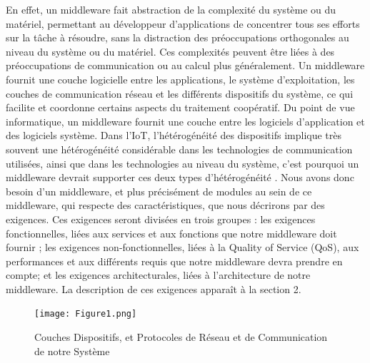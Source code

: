 En effet, un middleware fait abstraction de la complexité du système ou du matériel, permettant au développeur d'applications de concentrer tous ses efforts sur la tâche à résoudre, sans la distraction des préoccupations orthogonales au niveau du système ou du matériel. Ces complexités peuvent être liées à des préoccupations de communication ou au calcul plus généralement. Un middleware fournit une couche logicielle entre les applications, le système d'exploitation, les couches de communication réseau et les différents dispositifs du système, ce qui facilite et coordonne certains aspects du traitement coopératif. Du point de vue informatique, un middleware fournit une couche entre les logiciels d'application et des logiciels système. Dans l'IoT, l’hétérogénéité des dispositifs implique très souvent une hétérogénéité considérable dans les technologies de communication utilisées, ainsi que dans les technologies au niveau du système, c’est pourquoi un middleware devrait supporter ces deux types d’hétérogénéité \cite{li2015iot}. Nous avons donc besoin d’un middleware, et plus précisément de modules au sein de ce middleware, qui respecte des caractéristiques, que nous décrirons par des exigences. Ces exigences seront divisées en trois groupes : les exigences fonctionnelles, liées aux services et aux fonctions que notre middleware doit fournir ; les exigences non-fonctionnelles, liées à la Quality of Service (QoS), aux performances et aux différents requis que notre middleware devra prendre en compte; et les exigences architecturales, liées à l’architecture de notre middleware. La description de ces exigences apparaît à la section 2.
\\
\begin{figure}[h!]
	\hspace*{-1cm}
	\centering
	\texttt{[image: Figure1.png]}
	\caption{Couches Dispositifs, et Protocoles de Réseau et de Communication de notre Système}
	\label{fig:couches}
\end{figure}

